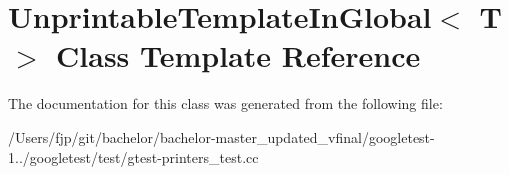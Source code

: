 \hypertarget{class_unprintable_template_in_global}{}\section{Unprintable\+Template\+In\+Global$<$ T $>$ Class Template Reference}
\label{class_unprintable_template_in_global}


The documentation for this class was generated from the following file\+:\begin{DoxyCompactItemize}
\item 
/\+Users/fjp/git/bachelor/bachelor-\/master\+\_\+updated\+\_\+vfinal/googletest-\/1../googletest/test/gtest-\/printers\+\_\+test.\+cc\end{DoxyCompactItemize}
